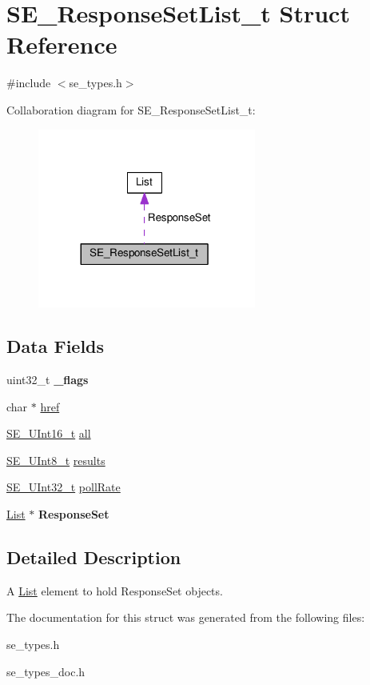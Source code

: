 \hypertarget{structSE__ResponseSetList__t}{}\section{S\+E\+\_\+\+Response\+Set\+List\+\_\+t Struct Reference}
\label{structSE__ResponseSetList__t}


{\ttfamily \#include $<$se\+\_\+types.\+h$>$}



Collaboration diagram for S\+E\+\_\+\+Response\+Set\+List\+\_\+t\+:\nopagebreak
\begin{figure}[H]
\begin{center}
\leavevmode
\includegraphics[width=203pt]{structSE__ResponseSetList__t__coll__graph}
\end{center}
\end{figure}
\subsection*{Data Fields}
\begin{DoxyCompactItemize}
\item 
uint32\+\_\+t {\bfseries \+\_\+flags}
\item 
char $\ast$ \hyperlink{group__ResponseSetList_gadc2f2a201658b2bf27072ae811b9b014}{href}
\item 
\hyperlink{group__UInt16_gac68d541f189538bfd30cfaa712d20d29}{S\+E\+\_\+\+U\+Int16\+\_\+t} \hyperlink{group__ResponseSetList_gacd39a1a009fb2aa7adbea7016bfe6c29}{all}
\item 
\hyperlink{group__UInt8_gaf7c365a1acfe204e3a67c16ed44572f5}{S\+E\+\_\+\+U\+Int8\+\_\+t} \hyperlink{group__ResponseSetList_gaa96307d02ec1a098b78dc3f11eedff51}{results}
\item 
\hyperlink{group__UInt32_ga70bd4ecda3c0c85d20779d685a270cdb}{S\+E\+\_\+\+U\+Int32\+\_\+t} \hyperlink{group__ResponseSetList_gad0b2c3c48abf6ac9c5426cc6942d4b55}{poll\+Rate}
\item 
\hyperlink{structList}{List} $\ast$ {\bfseries Response\+Set}
\end{DoxyCompactItemize}


\subsection{Detailed Description}
A \hyperlink{structList}{List} element to hold Response\+Set objects. 

The documentation for this struct was generated from the following files\+:\begin{DoxyCompactItemize}
\item 
se\+\_\+types.\+h\item 
se\+\_\+types\+\_\+doc.\+h\end{DoxyCompactItemize}
